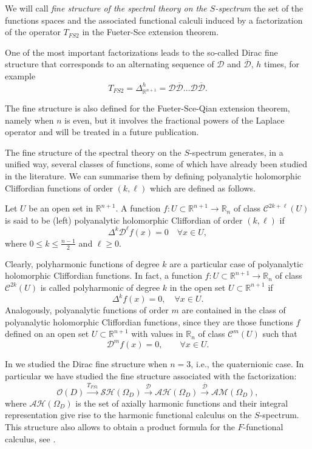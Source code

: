 \documentclass[reqno,11pt]{amsart}
\numberwithin{equation}{section}
\theoremstyle{definition}
\begin{document}
\medskip
We will call {\em fine structure of the  spectral theory on the $S$-spectrum}
 the set of the functions spaces and the associated functional calculi
 induced by a factorization of the operator $T_{FS2}$ in the Fueter-Sce extension theorem.


\medskip
One of the most important factorizations leads to the so-called
 Dirac fine structure that corresponds to an alternating sequence
of $ \mathcal{D}$ and $ \mathcal{\overline{D}}$, $h$ times, for example
$$ T_{FS2}=\Delta_{\mathbb{R}^{n+1}}^{h}= \mathcal{D} \mathcal{\overline{D}}\ldots \mathcal{D}\mathcal{\overline{D}}.$$


\medskip
The fine structure is also defined for the Fueter-Sce-Qian extension theorem, namely when $n$ is even, but it involves the fractional powers of the
 Laplace operator and will be treated in a future publication.

\medskip
The fine structure of the spectral theory on the $S$-spectrum
generates, in a unified way, several classes of functions,
some of which have already been studied in the literature.
We can summarise them by defining  polyanalytic holomorphic Cliffordian functions of order $(k, \ell)$ which are defined as follows.

\medskip
Let $U$ be an open set in $\mathbb{R}^{n+1}$. A function $f:U \subset \mathbb{R}^{n+1} \to \mathbb{R}_n$ of class $\mathcal{C}^{2k+ \ell}(U)$ is said to be (left) polyanalytic holomorphic Cliffordian of order $(k, \ell)$ if
	$$ \Delta^k \mathcal{D}^{\ell}  f(x)=0\quad \forall x\in U,$$
	where $0 \leq k \leq \frac{n-1}{2}$ and $ \ell \geq 0$.

\medskip
Clearly,  polyharmonic functions of degree $k$ are a particular case of polyanalytic holomorphic Cliffordian functions.
In fact, a  function $f:U \subset \mathbb{R}^{n+1} \to \mathbb{R}_n$ of class $\mathcal{C}^{2k}(U)$ is called polyharmonic of degree $k$ in the open set $U \subset \mathbb{R}^{n+1}$ if
	$$ \Delta^k f(x)=0, \quad\forall x \in U.$$
Analogously,  polyanalytic functions of order $m$ are contained in the class of polyanalytic holomorphic Cliffordian functions, since they are those
functions $f$ defined on an open set $ U \subset \mathbb{R}^{n+1}$ with values in $\mathbb{R}_n$  of class $ \mathcal{C}^{m}(U)$ such that
	$$ \mathcal{D}^{m}f(x)=0, \qquad \forall x \in U.$$

\medskip

In \cite{CDPS} we studied the Dirac fine structure when $n=3$, i.e., the quaternionic case.
In particular we have studied the fine structure associated with the factorization:
\begin{equation}
\label{fine1}
\mathcal{O}(D) \overset{T_{FS1}}{\longrightarrow} \mathcal{SH}(\Omega_D)\overset{\mathcal{D}}{\longrightarrow} \mathcal{AH}(\Omega_D)\overset{\mathcal{\overline{D}}}{\longrightarrow}\mathcal{AM}(\Omega_D),
\end{equation}
where $\mathcal{AH}(\Omega_D)$ is the set of axially harmonic functions
and their integral representation give rise to the harmonic functional calculus on the $S$-spectrum.
This structure also allows to obtain a product formula for the $F$-functional calculus, see \cite[Thm. 9.3]{CDPS}.
\end{document}
